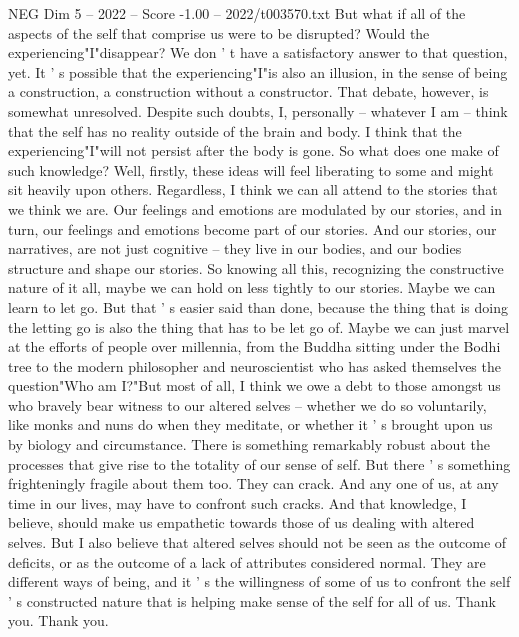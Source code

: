 \begin{textsample}{NEG Dim 5 – 2022 – Score -1.00 – 2022/t003570.txt}
But what if all of the aspects of the self that comprise us were to be disrupted?
Would the experiencing"I"disappear?
We don ' t have a satisfactory answer to that question, yet.
It ' s possible that the experiencing"I"is also an illusion, in the sense of being a construction, a construction without a constructor.
That debate, however, is somewhat unresolved.
Despite such doubts, I, personally -- whatever I am -- think that the self has no reality outside of the brain and body.
I think that the experiencing"I"will not persist after the body is gone.
So what does one make of such knowledge?
Well, firstly, these ideas will feel liberating to some and might sit heavily upon others.
Regardless, I think we can all attend to the stories that we think we are.
Our feelings and emotions are modulated by our stories, and in turn, our feelings and emotions become part of our stories.
And our stories, our narratives, are not just cognitive -- they live in our bodies, and our bodies structure and shape our stories.
So knowing all this, recognizing the constructive nature of it all, maybe we can hold on less tightly to our stories.
Maybe we can learn to let go.
But that ' s easier said than done, because the thing that is doing the letting go is also the thing that has to be let go of.
Maybe we can just marvel at the efforts of people over millennia, from the Buddha sitting under the Bodhi tree to the modern philosopher and neuroscientist who has asked themselves the question"Who am I?"But most of all, I think we owe a debt to those amongst us who bravely bear witness to our altered selves -- whether we do so voluntarily, like monks and nuns do when they meditate, or whether it ' s brought upon us by biology and circumstance.
There is something remarkably robust about the processes that give rise to the totality of our sense of self.
But there ' s something frighteningly fragile about them too.
They can crack.
And any one of us, at any time in our lives, may have to confront such cracks.
And that knowledge, I believe, should make us empathetic towards those of us dealing with altered selves.
But I also believe that altered selves should not be seen as the outcome of deficits, or as the outcome of a lack of attributes considered normal.
They are different ways of being, and it ' s the willingness of some of us to confront the self ' s constructed nature that is helping make sense of the self for all of us.
Thank you.
Thank you.

\end{textsample}
